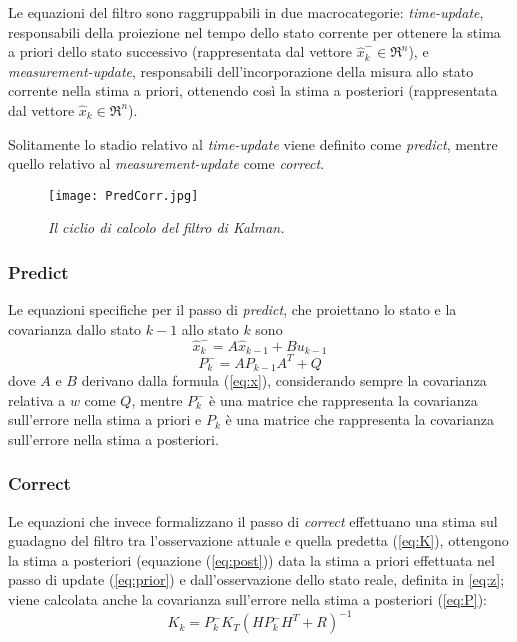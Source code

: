 Le equazioni del filtro sono raggruppabili in due macrocategorie: \textit{time-update}, responsabili della proiezione nel tempo dello stato corrente per ottenere la stima a priori dello stato successivo (rappresentata dal vettore $\hat{x}_k^- \in \Re^n$), e \textit{measurement-update}, responsabili dell'incorporazione della misura allo stato corrente nella stima a priori, ottenendo così la stima a posteriori (rappresentata dal vettore $\hat{x}_k \in \Re^n$). 

Solitamente lo stadio relativo al \textit{time-update} viene definito come \textit{predict}, mentre quello relativo al \textit{measurement-update} come \textit{correct}.

\begin{figure}[hb]
\centering
	\texttt{[image: PredCorr.jpg]}
\caption{\textit{Il ciclio di calcolo del filtro di Kalman.}\label{fig:predictcorrect}}
\end{figure}
\subsubsection{Predict}
Le equazioni specifiche per il passo di \textit{predict}, che proiettano lo stato e la covarianza dallo stato $k-1$ allo stato $k$ sono 
\begin{equation}\label{eq:prior}
\hat{x}_k^-=A \hat{x}_{k-1}+Bu_{k-1}
\end{equation} 
\begin{equation}
P_k^-=A P_{k-1}A^T+Q
\end{equation} 
dove $A$ e $B$ derivano dalla formula (\ref{eq:x}), considerando sempre la covarianza relativa a $w$ come $Q$, mentre $P_k^-$ è una matrice che rappresenta la covarianza sull'errore nella stima a priori e $P_k$ è una matrice che rappresenta la covarianza sull'errore nella stima a posteriori.
\subsubsection{Correct}

Le equazioni che invece formalizzano il passo di \textit{correct} effettuano una stima sul guadagno del filtro tra l'osservazione attuale e quella predetta (\ref{eq:K}), ottengono la stima a posteriori  (equazione (\ref{eq:post})) data la stima a priori effettuata nel passo di update (\ref{eq:prior}) e dall'osservazione dello stato reale, definita in \ref{eq:z}; viene calcolata anche la covarianza sull'errore nella stima a posteriori (\ref{eq:P}):
\begin{equation}\label{eq:K}
K_k = P_k^- K_T(HP_k^-H^T+R)^{-1}
\end{equation} 


